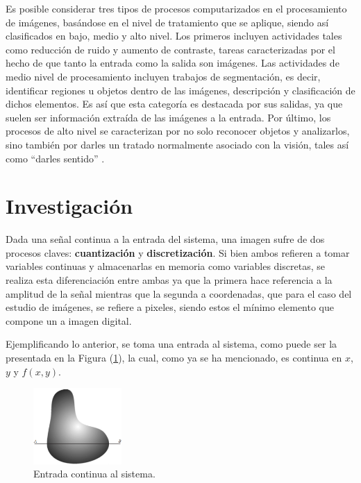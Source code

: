 Es posible considerar tres tipos de procesos computarizados en el procesamiento de imágenes, basándose en el nivel de tratamiento que se aplique, siendo así clasificados en bajo, medio y alto nivel. Los primeros incluyen actividades tales como reducción de ruido y aumento de contraste, tareas caracterizadas por el hecho de que tanto la entrada como la salida son imágenes. Las actividades de medio nivel de procesamiento incluyen trabajos de segmentación, es decir, identificar regiones u objetos dentro de las imágenes, descripción y clasificación de dichos elementos. Es así que esta categoría es destacada por sus salidas, ya que suelen ser información extraída de las imágenes a la entrada. Por último, los procesos de alto nivel se caracterizan por no solo reconocer objetos y analizarlos, sino también por darles un tratado normalmente asociado con la visión, tales así como ``darles sentido'' \cite{ref:intro1}.
	
	
\section{Investigación}
Dada una señal continua a la entrada del sistema, una imagen sufre de dos procesos claves: \textbf{cuantización} y \textbf{discretización}. Si bien ambos refieren a tomar variables continuas y almacenarlas en memoria como variables discretas, se realiza esta diferenciación entre ambas ya que la primera hace referencia a la amplitud de la señal mientras que la segunda a coordenadas, que para el caso del estudio de imágenes, se refiere a pixeles, siendo estos el mínimo elemento que compone un a imagen digital.
	
Ejemplificando lo anterior, se toma una entrada al sistema, como puede ser la presentada en la Figura (\ref{fig:disc1}), la cual, como ya se ha mencionado, es continua en $x$, $y$ y $f(x,y)$.
\begin{figure}[H]
\centering
	\includegraphics[width=0.3\textwidth]{Imagenes/Digitalizacion_1.png}
	\caption{Entrada continua al sistema.}
	\label{fig:disc1}
\end{figure}

